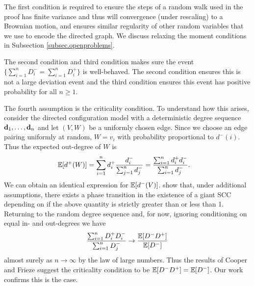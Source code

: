 The first condition is required to ensure the steps of a random walk used in the proof has finite variance and thus will convergence (under rescaling) to a Brownian motion, and ensures similar regularity of other random variables that we use to encode the directed graph. We discuss relaxing the moment conditions in Subsection \ref{subsec.openproblems}. 

The second condition and third condition makes sure the event $\{\sum_{i=1}^n D^-_i = \sum_{i=1}^n D^+_i\}$ is well-behaved. The second condition ensures this is not a large deviation event and the third condition ensures this event has positive probability for all $n \geq 1$. 

The fourth assumption is the criticality condition. To understand how this arises, consider the directed configuration model with a deterministic degree sequence ${\mathbf d}_1, \ldots, {\mathbf d}_n$ and let $(V, W)$ be a uniformly chosen edge. Since we choose an edge pairing uniformly at random, $W = v_i$ with probability proportional to $d^-(i)$. Thus the expected out-degree of $W$ is
\begin{align*}
    {\mathbb E}[d^+(W)]
    &= \sum_{i=1}^n d_i^+ \frac{d_i^-}{\sum_{j=1}^n d_j^-}
    = \frac{\sum_{i=1}^n d_i^+ d_i^-}{\sum_{i=1}^n d_j^-}.
\end{align*}
We can obtain an identical expression for ${\mathbb E}[d^-(V)]$. \citet{cooperSizeLargestStrongly2004} show that, under additional assumptions, there exists a phase transition in the existence of a giant SCC depending on if the above quantity is strictly greater than or less than 1. Returning to the random degree sequence and, for now, ignoring conditioning on equal in- and out-degrees we have
\begin{equation*}
    \frac{\sum_{i=1}^n D_i^+ D_i^-}{\sum_{i=1}^n D_j^{-}}
    \to \frac{{\mathbb E}[D^- D^+]}{{\mathbb E}[D^-]}
\end{equation*}
almost surely as $n \to \infty$ by the law of large numbers. Thus the results of Cooper and Frieze suggest the criticality condition to be ${\mathbb E}[D^- D^+] = {\mathbb E}[D^-]$. Our work confirms this is the case.


